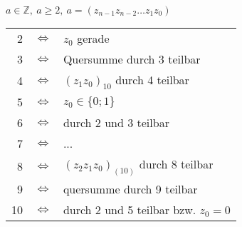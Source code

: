 $a \in \mathbb{Z},\ a \geq 2,\ a=(z_{n-1}z_{n-2} \dots z_1z_0)$ \\
\begin{tabular}{rcl}
    2  & $\Leftrightarrow$ & $z_0$ gerade                         \\
    3  & $\Leftrightarrow$ & Quersumme durch 3 teilbar            \\
    4  & $\Leftrightarrow$ & $(z_1z_0)_{10}$ durch 4 teilbar      \\
    5  & $\Leftrightarrow$ & $z_0 \in \lbrace 0; 1 \rbrace$       \\
    6  & $\Leftrightarrow$ & durch 2 und 3 teilbar                \\
    7  & $\Leftrightarrow$ & ...                                  \\
    8  & $\Leftrightarrow$ & $(z_2z_1z_0)_{(10)}$ durch 8 teilbar \\
    9  & $\Leftrightarrow$ & quersumme durch 9 teilbar            \\
    10 & $\Leftrightarrow$ & durch 2 und 5 teilbar bzw. $z_0=0$
\end{tabular}